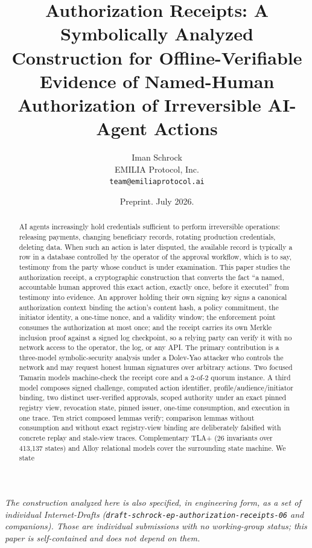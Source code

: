 \documentclass[11pt]{article}
\title{Authorization Receipts: A Symbolically Analyzed Construction for
Offline-Verifiable Evidence of Named-Human Authorization of Irreversible
AI-Agent Actions}
\author{Iman Schrock\\
EMILIA Protocol, Inc.\\
\texttt{team@emiliaprotocol.ai}}
\date{Preprint. July 2026.}
\newcommand{\code}[1]{\texttt{#1}}
\begin{document}
\maketitle

\begin{center}
\emph{The construction analyzed here is also specified, in engineering form, as a
set of individual Internet-Drafts (\code{draft-schrock-ep-authorization-receipts-06}
and companions). Those are individual submissions with no working-group status;
this paper is self-contained and does not depend on them.}
\end{center}

\begin{abstract}
AI agents increasingly hold credentials sufficient to perform irreversible
operations: releasing payments, changing beneficiary records, rotating
production credentials, deleting data. When such an action is later disputed,
the available record is typically a row in a database controlled by the operator
of the approval workflow, which is to say, testimony from the party whose conduct
is under examination. This paper studies the authorization receipt, a
cryptographic construction that converts the fact ``a named, accountable human
approved this exact action, exactly once, before it executed'' from testimony
into evidence. An approver holding their own signing key signs a canonical
authorization context binding the action's content hash, a policy commitment, the
initiator identity, a one-time nonce, and a validity window; the enforcement
point consumes the authorization at most once; and the receipt carries its own
Merkle inclusion proof against a signed log checkpoint, so a relying party can
verify it with no network access to the operator, the log, or any API. The
primary contribution is a three-model symbolic-security analysis under a
Dolev-Yao attacker who controls the network and may request honest human
signatures over arbitrary actions. Two focused Tamarin models machine-check the
receipt core and a 2-of-2 quorum instance. A third model composes signed
challenge, computed action identifier, profile/audience/initiator binding, two
distinct user-verified approvals, scoped authority under an exact pinned registry
view, revocation state, pinned issuer, one-time consumption, and execution in one
trace. Ten strict composed lemmas verify; comparison lemmas without consumption
and without exact registry-view binding are deliberately falsified with concrete
replay and stale-view traces. Complementary TLA+ (26 invariants over 413,137
states) and Alloy relational models cover the surrounding state machine. We state

\end{abstract}
\end{document}
